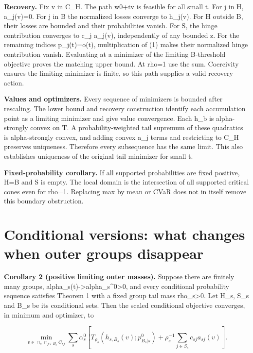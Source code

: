 \documentclass[10pt]{article}
\begin{document}
\textbf{Recovery.} Fix v in C\_H. The path w0+tv is feasible for all small t. For j in H, a\_j(v)=0. For j in B the normalized losses converge to h\_j(v). For H outside B, their losses are bounded and their probabilities vanish. For S, the hinge contribution converges to c\_j a\_j(v), independently of any bounded z. For the remaining indices p\_j(t)=o(t), multiplication of (1) makes their normalized hinge contribution vanish. Evaluating at a minimizer of the limiting B-threshold objective proves the matching upper bound. At rho=1 use the sum. Coercivity ensures the limiting minimizer is finite, so this path supplies a valid recovery action.

\textbf{Values and optimizers.} Every sequence of minimizers is bounded after rescaling. The lower bound and recovery construction identify each accumulation point as a limiting minimizer and give value convergence. Each h\_b is alpha-strongly convex on T. A probability-weighted tail supremum of these quadratics is alpha-strongly convex, and adding convex a\_j terms and restricting to C\_H preserves uniqueness. Therefore every subsequence has the same limit. This also establishes uniqueness of the original tail minimizer for small t.

\textbf{Fixed-probability corollary.} If all supported probabilities are fixed positive, H=B and S is empty. The local domain is the intersection of all supported critical cones even for rho=1. Replacing max by mean or CVaR does not in itself remove this boundary obstruction.

\section{Conditional versions: what changes when outer groups disappear}

\textbf{Corollary 2 (positive limiting outer masses).} Suppose there are finitely many groups, alpha\_s(t)->alpha\_s\textasciicircum{}0>0, and every conditional probability sequence satisfies Theorem 1 with a fixed group tail mass rho\_s>0. Let H\_s, S\_s and B\_s be its conditional sets. Then the scaled conditional objective converges, in minimum and optimizer, to

\begin{equation}
\min_{v\in\cap_s\cap_{j\in H_s}C_{sj}}
\sum_s\alpha_s^0\left[T_{\rho_s}(h_{s,B_s}(v);p^0_{B_s|s})
+\rho_s^{-1}\sum_{j\in S_s}c_{sj}a_{sj}(v)\right].\tag{5}
\end{equation}
\end{document}
